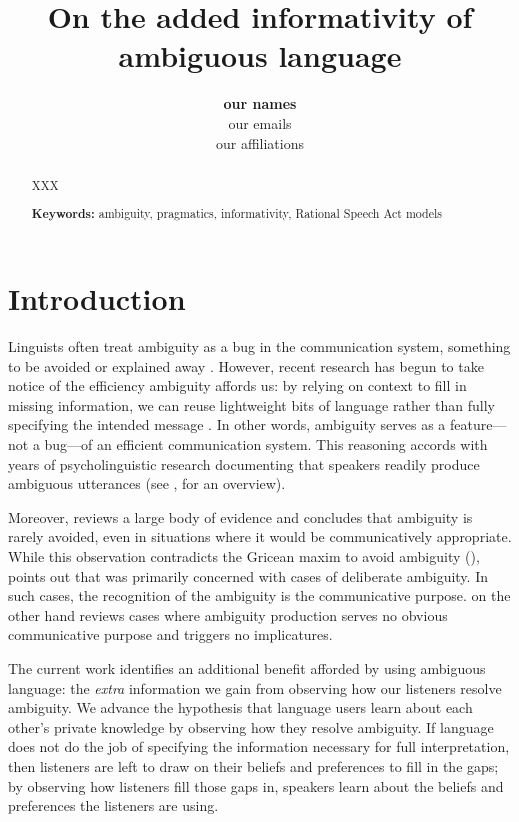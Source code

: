 \documentclass[10pt,a4paper]{article}
\title{On the added informativity of ambiguous language}
\author{\large \textbf{our names}\\
our emails\\
our affiliations}
\begin{document}
\maketitle

\begin{abstract}
XXX


\textbf{Keywords:} 
ambiguity, pragmatics, informativity, Rational Speech Act models

\end{abstract}

\section{Introduction}

Linguists often treat ambiguity as a bug in the communication system, something to be avoided or explained away \cite{grice1975,chomsky2002minimalism}. However, recent research has begun to take notice of the efficiency ambiguity affords us: by relying on context to fill in missing information, we can reuse lightweight bits of language rather than fully specifying the intended message \cite{levinson2000,piantadosietal2012,wasow2015}. In other words, ambiguity serves as a feature---not a bug---of an efficient communication system. This reasoning accords with years of psycholinguistic research documenting that speakers readily produce ambiguous utterances (see , for an overview). 

Moreover,  reviews a large body of evidence and concludes that ambiguity is rarely avoided, even in situations where it would be communicatively appropriate. While this observation contradicts the Gricean maxim to avoid ambiguity (), \citeauthor{wasow2015} points out that \citeauthor{grice1975} was primarily concerned with cases of deliberate ambiguity. In such cases, the recognition of the ambiguity is the communicative purpose. \citeauthor{wasow2015} on the other hand reviews cases where ambiguity production serves no obvious communicative purpose and triggers no implicatures. 

The current work identifies an additional benefit afforded by using ambiguous language: the \emph{extra} information we gain from observing how our listeners resolve ambiguity. We advance the hypothesis that language users learn about each other's private knowledge by observing how they resolve ambiguity. If language does not do the job of specifying the information necessary for full interpretation, then listeners are left to draw on their beliefs and preferences to fill in the gaps; by observing how listeners fill those gaps in, speakers learn about the beliefs and preferences the listeners are using. 
\end{document}
